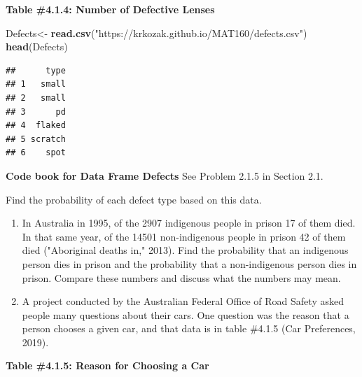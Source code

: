 \documentclass[
]{book}
\newenvironment{Shaded}{\begin{snugshade}}{\end{snugshade}}
\newcommand{\KeywordTok}[1]{\textcolor[rgb]{0.13,0.29,0.53}{\textbf{#1}}}
\newcommand{\NormalTok}[1]{#1}
\newcommand{\StringTok}[1]{\textcolor[rgb]{0.31,0.60,0.02}{#1}}
\begin{document}
\textbf{Table \#4.1.4: Number of Defective Lenses}

\begin{Shaded}
\begin{Highlighting}[]
\NormalTok{Defects<-}\StringTok{ }\KeywordTok{read.csv}\NormalTok{(}\StringTok{"https://krkozak.github.io/MAT160/defects.csv"}\NormalTok{) }
\KeywordTok{head}\NormalTok{(Defects)}
\end{Highlighting}
\end{Shaded}

\begin{verbatim}
##      type
## 1   small
## 2   small
## 3      pd
## 4  flaked
## 5 scratch
## 6    spot
\end{verbatim}

\textbf{Code book for Data Frame Defects} See Problem 2.1.5 in Section 2.1.

Find the probability of each defect type based on this data.

\begin{enumerate}
\def\labelenumi{\arabic{enumi}.}
\setcounter{enumi}{2}
\item
  In Australia in 1995, of the 2907 indigenous people in prison 17 of them died. In that same year, of the 14501 non-indigenous people in prison 42 of them died ("Aboriginal deaths in," 2013). Find the
  probability that an indigenous person dies in prison and the probability that a non-indigenous person dies in prison. Compare these numbers and discuss what the numbers may mean.
\item
  A project conducted by the Australian Federal Office of Road Safety asked people many questions about their cars. One question was the reason that a person chooses a given car, and that data is in table
  \#4.1.5 (Car Preferences, 2019).
\end{enumerate}

\textbf{Table \#4.1.5: Reason for Choosing a Car}
\end{document}
